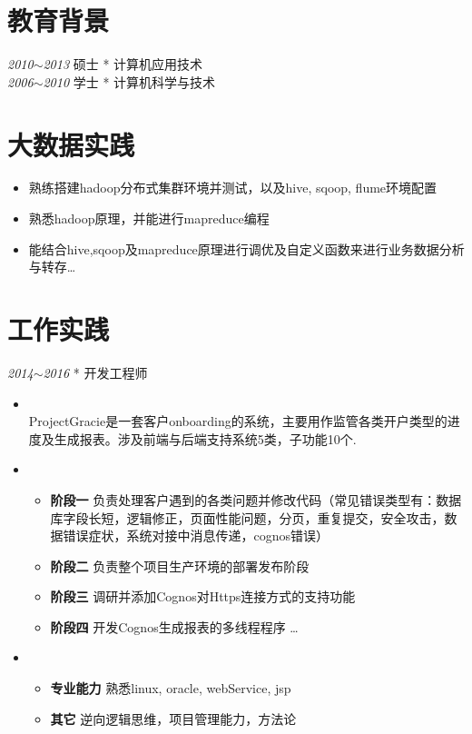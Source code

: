 \documentclass[line,margin]{res}
\begin{document}
\begin{resume}	
\section{教育背景}

{\sl 2010$\sim$2013} \hfill 硕士 \hfill ** \hfill 计算机应用技术 \\
[10pt]
{\sl 2006$\sim$2010} \hfill 学士 \hfill ** \hfill 计算机科学与技术 \\


\section{大数据实践} 
\begin{itemize}
	\item 熟练搭建hadoop分布式集群环境并测试，以及hive, sqoop, flume环境配置
	\item 熟悉hadoop原理，并能进行mapreduce编程
    \item 能结合hive,sqoop及mapreduce原理进行调优及自定义函数来进行业务数据分析与转存\ldots
\end{itemize}	

\section{工作实践} 
{\sl 2014$\sim$2016} \hfill ** \hfill 开发工程师 \\
\begin{itemize}
\item {} \\ProjectGracie是一套客户onboarding的系统，主要用作监管各类开户类型的进度及生成报表。涉及前端与后端支持系统5类，子功能10个. \\
\item {}
	\begin{itemize} \itemsep -3pt
		\item {\bf 阶段一} 负责处理客户遇到的各类问题并修改代码（常见错误类型有：数据库字段长短，逻辑修正，页面性能问题，分页，重复提交，安全攻击，数据错误症状，系统对接中消息传递，cognos错误）
		\item {\bf 阶段二} 负责整个项目生产环境的部署发布阶段
		\item {\bf 阶段三} 调研并添加Cognos对Https连接方式的支持功能
		\item {\bf 阶段四} 开发Cognos生成报表的多线程程序 \ldots 
	\end{itemize}	
\item {}
	\begin{itemize}
		\item {\bf 专业能力} 熟悉linux, oracle, webService, jsp
		\item {\bf 其它} 逆向逻辑思维，项目管理能力，方法论
	\end{itemize}


\end{itemize}
\end{resume}
\end{document}
